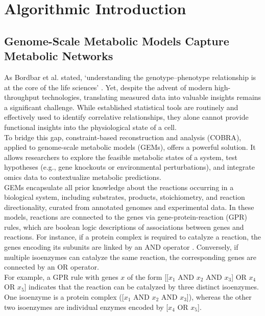 \chapter{Algorithmic Introduction }
\label{chap:two}

\section{Genome-Scale Metabolic Models Capture Metabolic Networks}
As Bordbar et al. stated, ‘understanding the genotype–phenotype relationship is at the core of the life sciences’ \citep{bordbarConstraintbasedModelsPredict2014}.
Yet, despite the advent of modern high-throughput technologies, translating measured data into valuable insights remains a significant challenge. While established statistical tools are routinely and effectively used to identify correlative relationships, they alone cannot provide functional insights into the physiological state of a cell. 
\\

To bridge this gap, constraint-based reconstruction and analysis (\gls{COBRA}), applied to genome-scale metabolic models (\glspl{GEM}), 
offers a powerful solution. It allows researchers to explore the feasible metabolic states of a system, test hypotheses (e.g., gene knockouts or environmental perturbations), and integrate omics data to contextualize metabolic predictions.
\\

GEMs encapsulate all prior knowledge about the reactions occurring in a biological system, including substrates, products, stoichiometry, and reaction directionality, curated from annotated genomes and experimental data. In these models, reactions are connected to the genes via gene-protein-reaction (\gls{GPR}) rules, which are boolean logic descriptions of associations between genes and reactions. For instance, if a protein complex is required to catalyze a reaction, the genes encoding its subunits are linked by an AND operator . Conversely, if multiple isoenzymes can catalyze the same reaction, the corresponding genes are connected by an OR operator.
\\

For example, a GPR  rule with genes $x$ of the form [[$x_1$ AND $x_2$ AND $x_3$] OR $x_4$ OR $x_5$] indicates that the reaction can be catalyzed by three distinct isoenzymes. One isoenzyme is a protein complex ([$x_1$ AND $x_2$ AND $x_3$]),  whereas the other two isoenzymes are individual enzymes encoded by [$x_4$ OR $x_5$].

